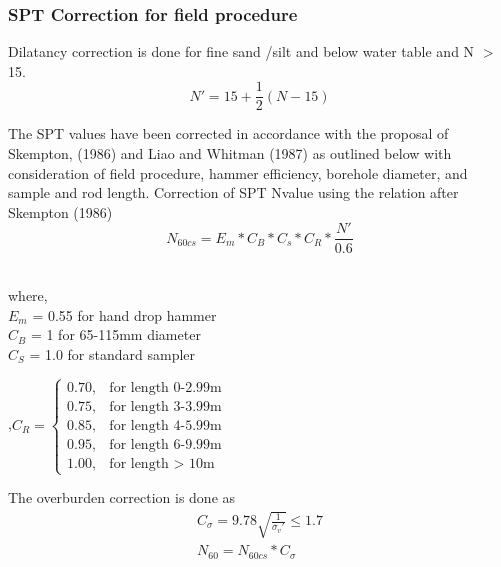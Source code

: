 \subsubsection{SPT Correction for field procedure}
Dilatancy correction is done for fine sand /silt and below water table and N $>$ 15.
\begin{equation}
N'= 15 + \frac{1}{2} (N - 15)
\end{equation}

The SPT values have been corrected in accordance with the proposal of Skempton, (1986) and Liao and Whitman (1987) as outlined below with consideration of field procedure, hammer efficiency, borehole diameter, and sample and rod length. Correction of SPT N\-value using the relation after Skempton (1986) \cite{panthi_bearing_2018}
\begin{equation}
N_{60cs}= E_m * C_B * C_s * C_R * \frac{N'}{0.6}
\end{equation}\\
\begin{minipage}[t]{0.48\linewidth}
\vspace{0pt}
  where,\\
  $E_m$ = 0.55 for hand drop hammer\\
  $C_B$ = 1 for 65-115mm diameter\\
  $C_S$ = 1.0 for standard sampler\\
\end{minipage}
\hfill
\begin{minipage}[t]{0.48\linewidth}
\vspace{0pt}
,\begin{math}
  C_R = \begin{cases}
    0.70, & \text{for length 0-2.99m} \\
    0.75, & \text{for length 3-3.99m} \\
    0.85, & \text{for length 4-5.99m} \\
	0.95, & \text{for length 6-9.99m} \\
    1.00, & \text{for length $>$ 10m}
    \end{cases}
\end{math}
\end{minipage}

The overburden correction is done as
\begin{gather}
C_\sigma = 9.78 \sqrt{ \frac{1}{\sigma_v'} } \le 1.7 \\ 
N_{60} = N_{60cs} * C_\sigma
\end{gather}

